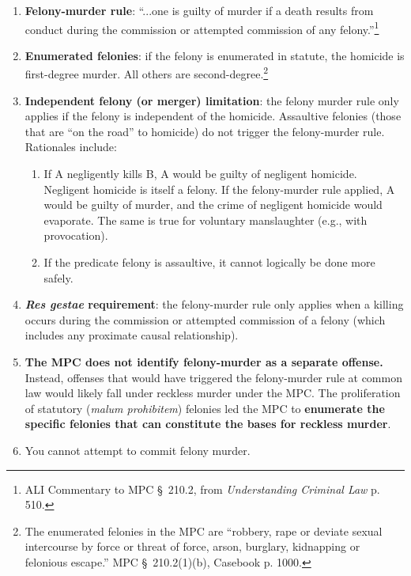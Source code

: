 \begin{enumerate}
    \item \textbf{Felony-murder rule}: ``...one is guilty of murder if a death results from conduct during 
    the commission or attempted commission of any felony.''\footnote{ALI 
    Commentary to MPC \S\ 210.2, from \emph{Understanding Criminal Law} p. 
    510.}
    \item \textbf{Enumerated felonies}: if the felony is enumerated in 
    statute, the homicide is first-degree murder. All others are 
    second-degree.\footnote{The enumerated felonies in the MPC are ``robbery, 
    rape or deviate sexual intercourse by force or threat of force, arson, 
    burglary, kidnapping or felonious escape.'' MPC \S\ 210.2(1)(b), Casebook 
    p. 1000.}

    \item \textbf{Independent felony (or merger) limitation}: the felony 
    murder rule only applies if the felony is independent of the homicide. 
    Assaultive felonies (those that are ``on the road'' to homicide) do not 
    trigger the felony-murder rule. Rationales include:
    \begin{enumerate}
        \item If A negligently kills B, A would be guilty of negligent 
        homicide. Negligent homicide is itself a felony. If the felony-murder 
        rule applied, A would be guilty of murder, and the crime of negligent 
        homicide would evaporate. The same is true for voluntary manslaughter 
        (e.g., with provocation).
        \item If the predicate felony is assaultive, it cannot logically be 
        done more safely.
    \end{enumerate}
    \item \textbf{\emph{Res gestae} requirement}: the felony-murder rule only 
    applies when a killing occurs during the commission or attempted 
    commission of a felony (which includes any proximate causal relationship).
    \item \textbf{The MPC does not identify felony-murder as a separate 
    offense.} Instead, offenses that would have triggered the felony-murder 
    rule at common law would likely fall under reckless murder under the MPC. 
    The proliferation of statutory (\emph{malum prohibitem}) felonies led the 
    MPC to \textbf{enumerate the specific felonies that can constitute the bases for 
    reckless murder}.
    \item You cannot attempt to commit felony murder. %

\end{enumerate}
